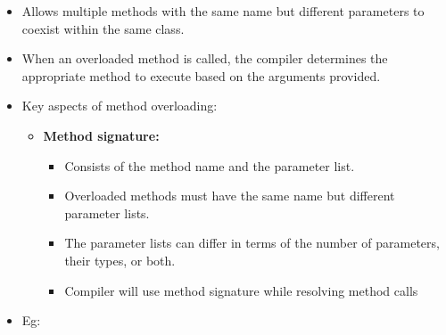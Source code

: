 \setlength{\columnsep}{3pt}
\begin{flushleft}
	
	\begin{itemize}
		\item Allows multiple methods with the same name but different parameters to coexist within the same class. 
		\item When an overloaded method is called, the compiler determines the appropriate method to execute based on the arguments provided.
		
		\item Key aspects of method overloading:
		\bigskip
		\begin{itemize}
			\item \textbf{Method signature:} 
			\begin{itemize}
				\item Consists of the method name and the parameter list. 
				\bigskip
				\bigskip
				\item Overloaded methods must have the same name but different parameter lists. \item The parameter lists can differ in terms of the number of parameters, their types, or both.
				\item Compiler will use method signature while resolving method calls
			\end{itemize}
			\bigskip
						
		\end{itemize}
		\newpage
			\item Eg:
			

\end{itemize}
\end{flushleft}
